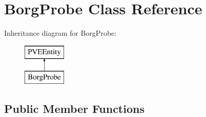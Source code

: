 \hypertarget{classBorgProbe}{
\section{BorgProbe Class Reference}
\label{db/deb/classBorgProbe}
}
Inheritance diagram for BorgProbe:\begin{figure}[H]
\begin{center}
\leavevmode
\includegraphics[height=2cm]{db/deb/classBorgProbe}
\end{center}
\end{figure}
\subsection*{Public Member Functions}
